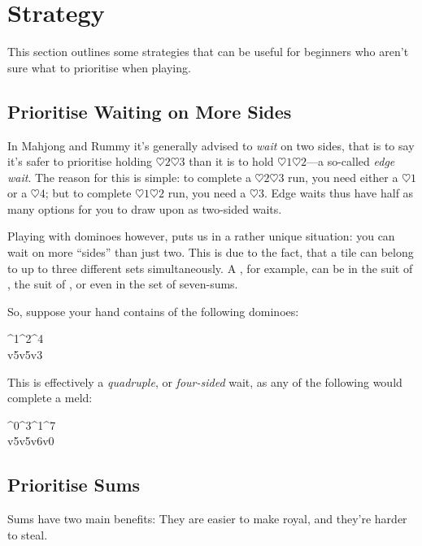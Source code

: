 \section{Strategy}
This section outlines some strategies that can be useful for beginners who aren't sure what to prioritise when playing.

\subsection{Prioritise Waiting on More Sides}
In Mahjong and Rummy it's generally advised to \textit{wait} on two sides, that is to say it's safer to prioritise holding $\heartsuit 2\heartsuit 3$ than it is to hold $\heartsuit 1\heartsuit 2$---a so-called \textit{edge wait}.
The reason for this is simple: to complete a $\heartsuit 2\heartsuit 3$ run, you need either a $\heartsuit 1$ or a $\heartsuit 4$; but to complete $\heartsuit 1\heartsuit 2$ run, you need a $\heartsuit 3$. Edge waits thus have half as many options for you to draw upon as two-sided waits.

Playing with dominoes however, puts us in a rather unique situation: you can wait on more ``sides'' than just two.
This is due to the fact, that a tile can belong to up to three different sets simultaneously.
A {  }, for example, can be in the suit of {  }, the suit of {  }, or even in the set of seven-sums.

So, suppose your hand contains of the following dominoes:
\begin{center}
{ \domino%
	^1^2^4\\
	v5v5v3\\%
}
\end{center}
This is effectively a \textit{quadruple}, or \textit{four-sided} wait, as any of the following would complete a meld:
\begin{center}
	{ \domino%
		^0\hspace{2mm}^3\hspace{2mm}^1\hspace{2mm}^7\\
		v5\hspace{2mm}v5\hspace{2mm}v6\hspace{2mm}v0\\%
	}
\end{center}

\subsection{Prioritise Sums}
Sums have two main benefits: They are easier to make royal, and they're harder to steal.

